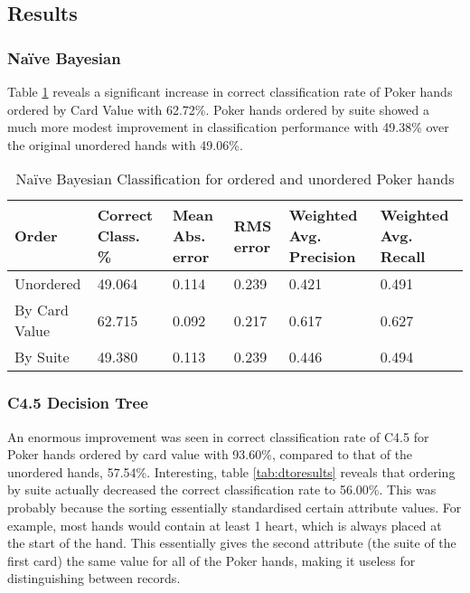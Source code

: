\documentclass[10pt, a4paper]{article}
\begin{document}
\subsection*{Results}

\subsubsection*{Na\"ive Bayesian}

Table \ref{tab:nboresults} reveals a significant increase in correct classification rate of Poker hands ordered by Card Value with 62.72\%. Poker hands ordered by suite showed a much more modest improvement in classification performance with 49.38\% over the original unordered hands with 49.06\%.

\begin{table}[htbp]
  \centering  
    \begin{tabular}{p{3cm}p{1.5cm}p{1.5cm}p{1.5cm}p{1.5cm}p{1.5cm}}
    \toprule
    \textbf{Order} & Correct Class. \% & Mean Abs. error & RMS error & Weighted Avg. Precision & Weighted Avg. Recall \\
    \midrule
    Unordered & 49.064 & 0.114 & 0.239 & 0.421 & 0.491 \\
    By Card Value & 62.715 & 0.092 & 0.217 & 0.617 & 0.627 \\
    By Suite & 49.380 & 0.113 & 0.239 & 0.446 & 0.494 \\
    \bottomrule
    \end{tabular}%
  \caption{Na\"ive Bayesian Classification for ordered and unordered Poker hands}
  \label{tab:nboresults}%
\end{table}%

\subsubsection*{C4.5 Decision Tree}

An enormous improvement was seen in correct classification rate of C4.5 for Poker hands ordered by card value with 93.60\%, compared to that of the unordered hands, 57.54\%. Interesting, table \ref{tab:dtoresults} reveals that ordering by suite actually decreased the correct classification rate to 56.00\%. This was probably because the sorting essentially standardised certain attribute values. For example, most hands would contain at least 1 heart, which is always placed at the start of the hand. This essentially gives the second attribute (the suite of the first card) the same value for all of the Poker hands, making it useless for distinguishing between records.
\end{document}
